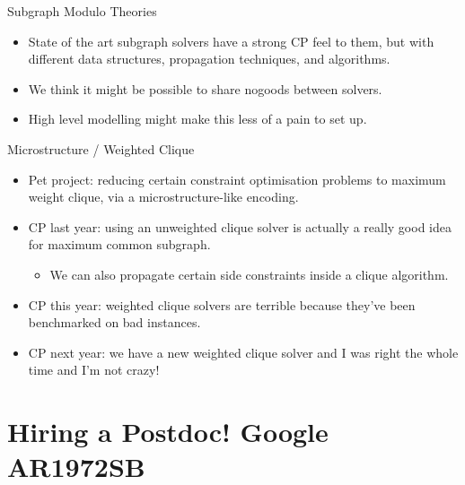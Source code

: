 \documentclass{beamer}
\begin{document}
\begin{frame}{Subgraph Modulo Theories}
    \begin{itemize}
        \item State of the art subgraph solvers have a strong CP feel to them, but with different
            data structures, propagation techniques, and algorithms.

        \item We think it might be possible to share nogoods between solvers.

        \item High level modelling might make this less of a pain to set up.
    \end{itemize}
\end{frame}

\begin{frame}{Microstructure / Weighted Clique}
    \begin{itemize}
        \item Pet project: reducing certain constraint optimisation problems to maximum weight
            clique, via a microstructure-like encoding.
        \item CP last year: using an unweighted clique solver is actually a really good idea for
            maximum common subgraph.
            \begin{itemize}
                \item We can also propagate certain side constraints inside a clique algorithm.
            \end{itemize}
        \item CP this year: weighted clique solvers are terrible because they've been benchmarked on
            bad instances.
        \item CP next year: we have a new weighted clique solver and I was right the whole time and
            I'm not crazy!
    \end{itemize}
\end{frame}

\section{Hiring a Postdoc! Google AR1972SB}
\end{document}
